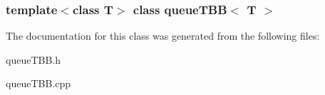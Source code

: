 \subsubsection*{template$<$class T$>$ class queueTBB$<$ T $>$}



The documentation for this class was generated from the following files:\begin{DoxyCompactItemize}
\item 
queueTBB.h\item 
queueTBB.cpp\end{DoxyCompactItemize}
